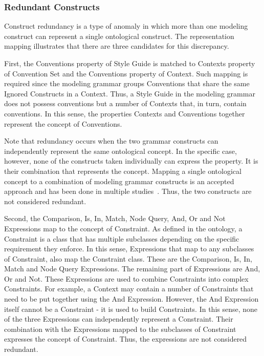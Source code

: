 \documentclass[parskip=full]{uvamscse}
\begin{document}
\subsubsection{Redundant Constructs} 

Construct redundancy is a type of anomaly in which more than one modeling construct can represent a
single ontological construct. The representation mapping illustrates that there are three candidates
for this discrepancy. 

First, the Conventions property of Style Guide is matched to Contexts property of Convention Set and
the Conventions property of Context. Such mapping is required since the modeling grammar groups
Conventions that share the same Ignored Constructs in a Context. Thus, a Style Guide in the modeling
grammar does not possess conventions but a number of Contexts that, in turn, contain conventions. In
this sense, the properties Contexts and Conventions together represent the concept of Conventions.

Note that redundancy occurs when the two grammar constructs can independently represent the same
ontological concept. In the specific case, however, none of the constructs taken individually can
express the property. It is their combination that represents the concept. Mapping a single
ontological concept to a combination of modeling grammar constructs is an accepted approach and has
been done in multiple studies~\cite{gehlert2007toward}. Thus, the two constructs are not
considered redundant.

Second, the Comparison, Is, In, Match, Node Query, And, Or and Not Expressions map to the concept of
Constraint. As defined in the ontology, a Constraint is a class that has multiple subclasses
depending on the specific requirement they enforce. In this sense, Expressions that map to any
subclasses of Constraint, also map the Constraint class. These are the Comparison, Is, In, Match and
Node Query Expressions. The remaining part of Expressions are And, Or and Not. These Expressions are
used to combine Constraints into complex Constraints. For example, a Context may contain a number of
Constraints that need to be put together using the And Expression. However, the And Expression
itself cannot be a Constraint - it is used to build Constraints. In this sense, none of the three
Expressions can independently represent a Constraint. Their combination with the Expressions mapped
to the subclasses of Constraint expresses the concept of Constraint. Thus, the expressions are not
considered redundant.
\end{document}
